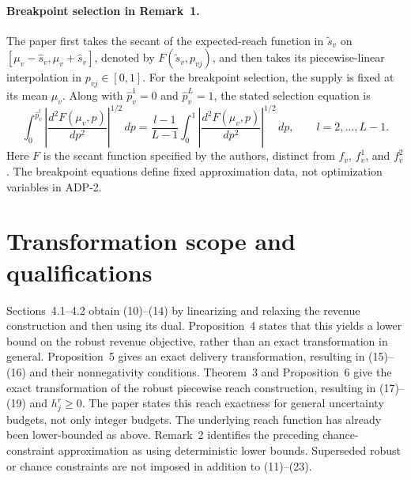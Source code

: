\documentclass{article}
\begin{document}
\paragraph{Breakpoint selection in Remark~1.}
The paper first takes the secant of the expected-reach function in $\tilde s_v$ on $[\mu_v-\hat s_v,\mu_v+\hat s_v]$, denoted by $F(\tilde s_v,p_{vj})$, and then takes its piecewise-linear interpolation in $p_{vj}\in[0,1]$. For the breakpoint selection, the supply is fixed at its mean $\mu_v$. Along with $\hat p^1_v=0$ and $\hat p^L_v=1$, the stated selection equation is
\[
\int_0^{\hat p^l_v}\left|\frac{d^2F(\mu_v,p)}{dp^2}\right|^{1/2}\,dp
=\frac{l-1}{L-1}\int_0^1\left|\frac{d^2F(\mu_v,p)}{dp^2}\right|^{1/2}\,dp,
\qquad l=2,\ldots,L-1.
\]
Here $F$ is the secant function specified by the authors, distinct from $f_v$, $f^1_v$, and $f^2_v$. The breakpoint equations define fixed approximation data, not optimization variables in ADP-2.

\section*{Transformation scope and qualifications}
Sections~4.1--4.2 obtain (10)--(14) by linearizing and relaxing the revenue construction and then using its dual. Proposition~4 states that this yields a lower bound on the robust revenue objective, rather than an exact transformation in general. Proposition~5 gives an exact delivery transformation, resulting in (15)--(16) and their nonnegativity conditions. Theorem~3 and Proposition~6 give the exact transformation of the robust piecewise reach construction, resulting in (17)--(19) and $h^r_j\geq0$. The paper states this reach exactness for general uncertainty budgets, not only integer budgets. The underlying reach function has already been lower-bounded as above. Remark~2 identifies the preceding chance-constraint approximation as using deterministic lower bounds. Superseded robust or chance constraints are not imposed in addition to (11)--(23).
\end{document}
